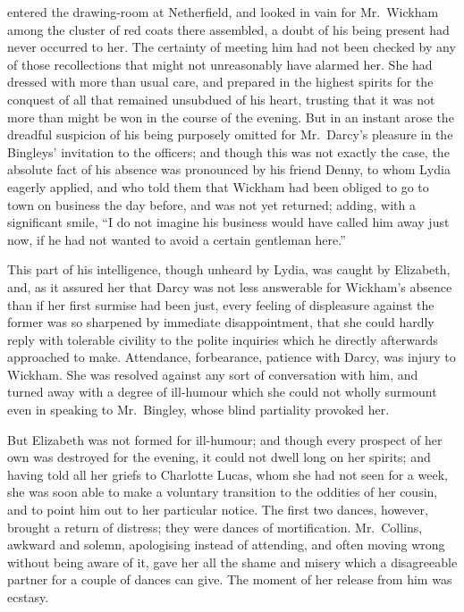  entered the drawing-room at Netherfield, and
looked in vain for Mr.\ Wickham among the cluster of red coats
there assembled, a doubt of his being present had never occurred
to her.  The certainty of meeting him had not been checked by
any of those recollections that might not unreasonably have
alarmed her.  She had dressed with more than usual care, and
prepared in the highest spirits for the conquest of all that
remained unsubdued of his heart, trusting that it was not more
than might be won in the course of the evening.  But in an
instant arose the dreadful suspicion of his being purposely
omitted for Mr.\ Darcy's pleasure in the Bingleys' invitation
to the officers; and though this was not exactly the case, the
absolute fact of his absence was pronounced by his friend Denny,
to whom Lydia eagerly applied, and who told them that Wickham
had been obliged to go to town on business the day before, and
was not yet returned; adding, with a significant smile, ``I do not
imagine his business would have called him away just now, if he
had not wanted to avoid a certain gentleman here.''

This part of his intelligence, though unheard by Lydia, was
caught by Elizabeth, and, as it assured her that Darcy was not
less answerable for Wickham's absence than if her first surmise
had been just, every feeling of displeasure against the former
was so sharpened by immediate disappointment, that she could
hardly reply with tolerable civility to the polite inquiries
which he directly afterwards approached to make.  Attendance,
forbearance, patience with Darcy, was injury to Wickham.  She
was resolved against any sort of conversation with him, and
turned away with a degree of ill-humour which she could not
wholly surmount even in speaking to Mr.\ Bingley, whose blind
partiality provoked her.

But Elizabeth was not formed for ill-humour; and though every
prospect of her own was destroyed for the evening, it could not
dwell long on her spirits; and having told all her griefs to
Charlotte Lucas, whom she had not seen for a week, she was
soon able to make a voluntary transition to the oddities of her
cousin, and to point him out to her particular notice.  The first
two dances, however, brought a return of distress; they were
dances of mortification.  Mr.\ Collins, awkward and solemn,
apologising instead of attending, and often moving wrong
without being aware of it, gave her all the shame and misery
which a disagreeable partner for a couple of dances can give.
The moment of her release from him was ecstasy.

